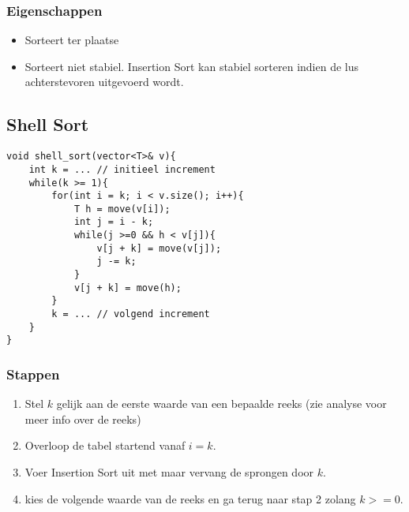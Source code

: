 \documentclass{report}
\begin{document}
\subsubsection{Eigenschappen}
\begin{itemize}
 \item Sorteert ter plaatse
 \item Sorteert niet stabiel. Insertion Sort kan stabiel sorteren indien de lus achterstevoren uitgevoerd wordt.
\end{itemize}

\subsection{Shell Sort}
\begin{lstlisting}
void shell_sort(vector<T>& v){
    int k = ... // initieel increment
    while(k >= 1){
        for(int i = k; i < v.size(); i++){
            T h = move(v[i]);
            int j = i - k;
            while(j >=0 && h < v[j]){
                v[j + k] = move(v[j]);
                j -= k;
            }
            v[j + k] = move(h);
        }
        k = ... // volgend increment
    }
}
\end{lstlisting}
\subsubsection{Stappen}
\begin{enumerate}
 \item Stel $k$ gelijk aan de eerste waarde van een bepaalde reeks (zie analyse voor meer info over de reeks)
 \item Overloop de tabel startend vanaf $i = k$.
 \item Voer Insertion Sort uit met maar vervang de sprongen door $k$.
 \item kies de volgende waarde van de reeks en ga terug naar stap 2 zolang $k >= 0$.
\end{enumerate}
\end{document}
